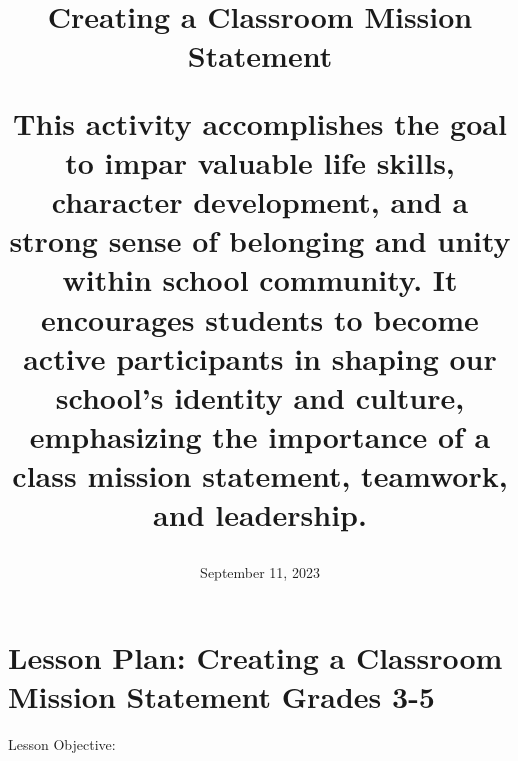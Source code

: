 \documentclass[14pt, letterpaper, twoside]{article}
\title{\textbf{Creating a Classroom Mission Statement}
    \begin{spacing}{1.5} 
	  This activity accomplishes the goal to impar valuable life skills, character development, and
	  a strong sense of belonging and unity within school community. It encourages students to become active participants in shaping our school's identity and culture, emphasizing the importance of a class mission statement, teamwork, and leadership.
    \end{spacing}}
\date{}
\author{September 11, 2023}
\begin{document}


\begin{titlepage}
  \maketitle 
  \thispagestyle{empty} 
\end{titlepage}

\pagestyle{headings}

\fancyhf{}
\fancyhead[R]{\thepage}
\pagestyle{fancy}
\renewcommand{\footrulewidth}{1 px}


\newpage
\tableofcontents

\thispagestyle{empty}
\newpage


\section{Lesson Plan: Creating a Classroom Mission Statement Grades 3-5}
Lesson Objective:
\end{document}
